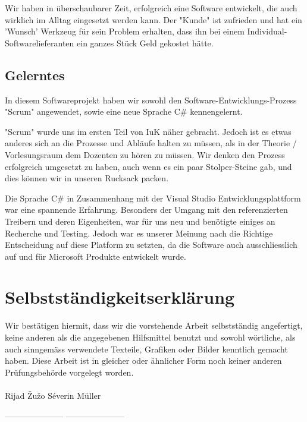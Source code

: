 \documentclass{article}
\begin{document}
Wir haben in überschaubarer Zeit, erfolgreich eine Software entwickelt, die auch wirklich im Alltag eingesetzt werden kann. Der "Kunde" ist zufrieden und hat ein 'Wunsch' Werkzeug für sein Problem erhalten, dass ihn bei einem Individual-Softwarelieferanten ein ganzes Stück Geld gekostet hätte.

\subsection{Gelerntes}

In diesem Softwareprojekt haben wir sowohl den Software-Entwicklungs-Prozess "Scrum" angewendet, sowie eine neue Sprache C\# kennengelernt.

"Scrum" wurde uns im ersten Teil von IuK näher gebracht. Jedoch ist es etwas anderes sich an die Prozesse und Abläufe halten zu müssen, als in der Theorie / Vorlesungsraum dem Dozenten zu hören zu müssen. Wir denken den Prozess erfolgreich umgesetzt zu haben, auch wenn es ein paar Stolper-Steine gab, und dies können wir in unseren Rucksack packen.

Die Sprache C\# in Zusammenhang mit der Visual Studio Entwicklungsplattform war eine spannende Erfahrung. Besonders der Umgang mit den referenzierten Treibern und deren Eigenheiten, war für uns neu und benötigte einiges an Recherche und Testing. Jedoch war es unserer Meinung nach die Richtige Entscheidung auf diese Platform zu setzten, da die Software auch ausschliesslich auf und für Microsoft Produkte entwickelt wurde.

\section{Selbstständigkeitserklärung}
Wir bestätigen hiermit, dass wir die vorstehende Arbeit selbstständig angefertigt,
keine anderen als die angegebenen Hilfsmittel benutzt und sowohl wörtliche, als auch sinngemäss
verwendete Texteile, Grafiken oder Bilder kenntlich gemacht haben.
Diese Arbeit ist in gleicher oder ähnlicher Form noch keiner anderen Prüfungsbehörde vorgelegt
worden. 
\\
\\

\centering
Rijad \v{Z}u\v{z}o \hspace{80mm}Séverin Müller


\vspace{15mm}


--------------------- \hspace{73mm}---------------------
\end{document}
